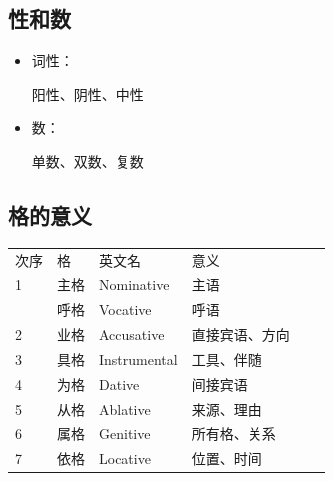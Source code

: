\documentclass[17pt]{beamer}
\begin{document}
\subsection{性和数}
\begin{frame}{\insertsubsection}
  \begin{itemize}
    \item
      词性：
      
      阳性、阴性、中性
    \item
      数：
      
      单数、双数、复数
  \end{itemize}  
\end{frame}

\subsection{格的意义}
\begin{frame}{\insertsubsection}
  \small
  \centering
  \begin{tabular}{@{}llllll@{}} %
    次序 & 格 & 英文名 & 意义  \\
    1 & 主格 & Nominative & 主语  \\
     & 呼格 & Vocative & 呼语  \\
    2 & 业格 & Accusative & 直接宾语、方向 \\
    3 & 具格 & Instrumental & 工具、伴随  \\
    4 & 为格 & Dative & 间接宾语  \\
    5 & 从格 & Ablative & 来源、理由  \\  
    6 & 属格 & Genitive & 所有格、关系  \\
    7 & 依格 & Locative & 位置、时间  \\ 
  \end{tabular}
\end{frame}
\end{document}
